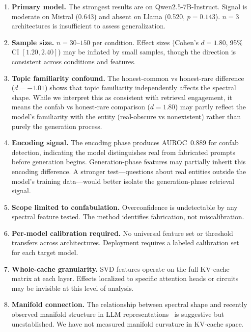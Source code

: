 \documentclass[11pt,a4paper]{article}
\begin{document}
\begin{enumerate}
\item \textbf{Primary model.} The strongest results are on
  Qwen2.5-7B-Instruct. Signal is moderate on Mistral (0.643) and
  absent on Llama (0.520, $p = 0.143$). $n=3$ architectures is insufficient to
  assess generalization.

\item \textbf{Sample size.} $n=30$--$150$ per condition. Effect sizes
  (Cohen's $d = 1.80$, 95\% CI $[1.20, 2.40]$) may be inflated by
  small samples, though the direction is consistent across conditions
  and features.

\item \textbf{Topic familiarity confound.} The honest-common vs
  honest-rare difference ($d = -1.01$) shows that topic familiarity
  independently affects the spectral shape. While we interpret this as
  consistent with retrieval engagement, it means the confab vs
  honest-rare comparison ($d = 1.80$) may partly reflect the model's
  familiarity with the entity (real-obscure vs nonexistent) rather
  than purely the generation process.

\item \textbf{Encoding signal.} The encoding phase produces
  AUROC~0.889 for confab detection, indicating the model distinguishes
  real from fabricated prompts before generation begins.
  Generation-phase features may partially inherit this encoding
  difference. A stronger test---questions about real entities outside
  the model's training data---would better isolate the generation-phase
  retrieval signal.

\item \textbf{Scope limited to confabulation.} Overconfidence is
  undetectable by any spectral feature tested. The method identifies
  fabrication, not miscalibration.

\item \textbf{Per-model calibration required.} No universal feature
  set or threshold transfers across architectures. Deployment requires
  a labeled calibration set for each target model.

\item \textbf{Whole-cache granularity.} SVD features operate on the
  full KV-cache matrix at each layer. Effects localized to specific
  attention heads or circuits may be invisible at this level of
  analysis.

\item \textbf{Manifold connection.} The relationship between spectral
  shape and recently observed manifold structure in LLM
  representations~\citep{manifold2025} is suggestive but
  unestablished. We have not measured manifold curvature in KV-cache
  space.


\end{enumerate}
\end{document}

